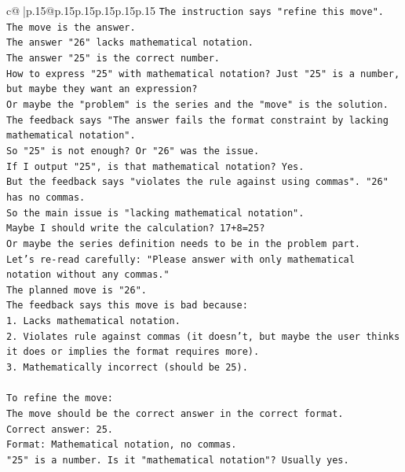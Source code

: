 \documentclass{article}
\begin{document}
{\begin{supertabular}{c@{$\;$}|p{.15\linewidth}@{}p{.15\linewidth}p{.15\linewidth}p{.15\linewidth}p{.15\linewidth}p{.15\linewidth}}
{{{\texttt{The instruction says "refine this move".} \\
\texttt{The move is the answer.} \\
\texttt{The answer "26" lacks mathematical notation.} \\
\texttt{The answer "25" is the correct number.} \\
\texttt{How to express "25" with mathematical notation? Just "25" is a number, but maybe they want an expression?} \\
\texttt{Or maybe the "problem" is the series and the "move" is the solution.} \\
\texttt{The feedback says "The answer fails the format constraint by lacking mathematical notation".} \\
\texttt{So "25" is not enough? Or "26" was the issue.} \\
\texttt{If I output "25", is that mathematical notation? Yes.} \\
\texttt{But the feedback says "violates the rule against using commas". "26" has no commas.} \\
\texttt{So the main issue is "lacking mathematical notation".} \\
\texttt{Maybe I should write the calculation? 17+8=25?} \\
\texttt{Or maybe the series definition needs to be in the problem part.} \\
\texttt{Let's re{-}read carefully: "Please answer with only mathematical notation without any commas."} \\
\texttt{The planned move is "26".} \\
\texttt{The feedback says this move is bad because:} \\
\texttt{1. Lacks mathematical notation.} \\
\texttt{2. Violates rule against commas (it doesn't, but maybe the user thinks it does or implies the format requires more).} \\
\texttt{3. Mathematically incorrect (should be 25).} \\
\\ 
\texttt{To refine the move:} \\
\texttt{The move should be the correct answer in the correct format.} \\
\texttt{Correct answer: 25.} \\
\texttt{Format: Mathematical notation, no commas.} \\
\texttt{"25" is a number. Is it "mathematical notation"? Usually yes.} \\
}}}
\end{supertabular}}
\end{document}
